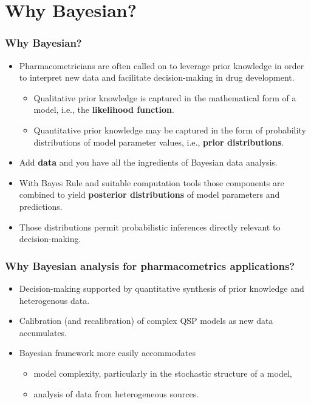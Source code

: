 \documentclass{beamer}
\begin{document}
\section{Why Bayesian?}

\begin{frame}
  \frametitle{Why Bayesian?}

  \begin{itemize}
  \item<1-> Pharmacometricians are often called on to leverage prior knowledge
  in order to interpret new data and facilitate decision-making in
  drug development.
  \begin{itemize}
  \item<2-> Qualitative prior knowledge is captured in the mathematical
    form of a model, i.e., the \textcolor{mrggreen}{\bf likelihood function}.
  \item<3-> Quantitative prior knowledge may be captured in the form of
    probability distributions of model parameter values, i.e.,
    \textcolor{mrggreen}{\bf prior
    distributions}.
  \end{itemize}
  \item<4-> Add \textcolor{mrggreen}{\bf data} and you have all the ingredients of Bayesian data
    analysis.
\item<5-> With Bayes Rule and suitable computation tools those components
  are combined to yield \textcolor{mrggreen}{\bf posterior distributions} of model parameters
  and predictions.
\item<5-> Those distributions permit probabilistic inferences directly
  relevant to decision-making.
  \end{itemize}

\end{frame}

\begin{frame}
  \frametitle{Why Bayesian analysis for pharmacometrics applications?}
  
  \begin{itemize}
  \item Decision-making supported by quantitative synthesis of prior
    knowledge and heterogenous data.
  \item Calibration (and recalibration) of complex QSP models as new
    data accumulates.
  \item Bayesian framework more easily accommodates
    \begin{itemize}
    \item model complexity, particularly in the stochastic structure
      of a model,
    \item analysis of data from heterogeneous sources.
    \end{itemize}
  \end{itemize}

\end{frame}
\end{document}
